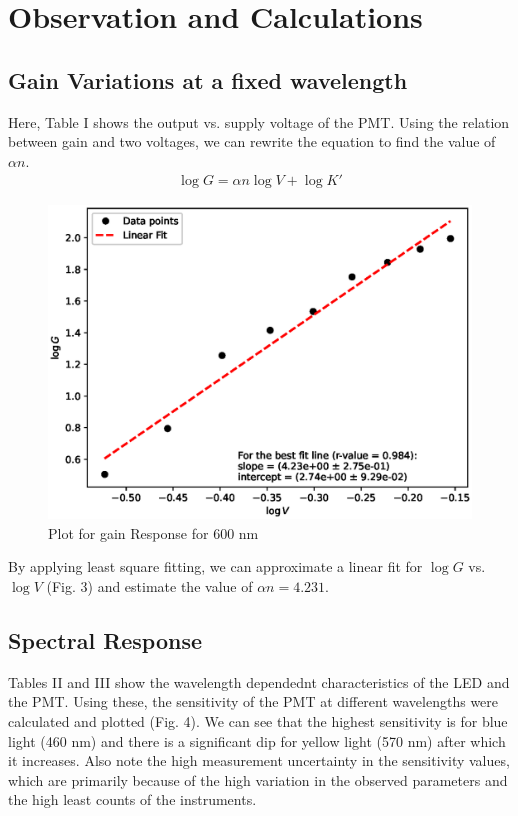 \section{Observation and Calculations}

\subsection{Gain Variations at a fixed wavelength}
Here, Table I shows the output vs. supply voltage of the PMT. Using the relation between gain and two voltages, we can rewrite the equation to find the value of $\alpha n$.
\begin{align*}
    \log G = \alpha n \log V + \log K'
\end{align*}



\begin{figure}[H]
    \centering
    \includegraphics[width=1\columnwidth]{images/gain.eps}
    \caption{Plot for gain Response for 600 nm}
    \label{g1}
\end{figure}

By applying least square fitting, we can approximate a linear fit for $\log G$ vs. $\log V$ (Fig. 3) and estimate the value of $\alpha n = 4.231$.
\vspace{-2em}
\subsection{Spectral Response}

Tables II and III show the wavelength dependednt characteristics of the LED and the PMT. Using these, the sensitivity of the PMT at different wavelengths were calculated and plotted (Fig. 4). We can see that the highest sensitivity is for blue light (460 nm) and there is a significant dip for yellow light (570 nm) after which it increases.
Also note the high measurement uncertainty in the sensitivity values, which are primarily because of the high variation in the observed parameters and the high least counts of the instruments.


